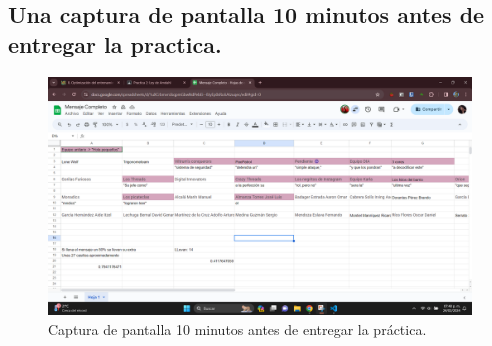 \documentclass{article}
\begin{document}
\subsection{Una captura de pantalla 10 minutos antes de entregar la practica.}
\begin{figure}
    \centering
    \includegraphics[width=\textwidth]{10minutos.png}
    \caption{Captura de pantalla 10 minutos antes de entregar la práctica.}
    \label{fig:captura-pantalla}
\end{figure}
\end{document}
